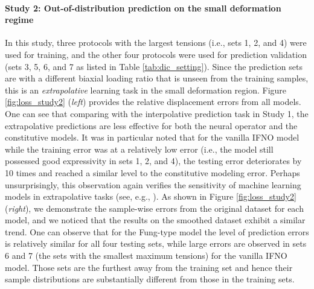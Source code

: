 \documentclass[twocolumn,10pt]{asme2ej}
\renewcommand{\~}{\tilde}
\renewcommand{\-}{\bar}
\newcommand{\8}{\infty}
\numberwithin{equation}{section}
\begin{document}
\paragraph{Study 2: Out-of-distribution prediction on the small deformation regime} In this study, three protocols with the largest tensions (i.e., sets 1, 2, and 4) were used for training, and the other four protocols were used for prediction validation (sets 3, 5, 6, and 7 as listed in Table \ref{tab:dic_setting}). Since the prediction sets are with a different biaxial loading ratio that is unseen from the training samples, this is an {\it extrapolative} learning task in the small deformation region. Figure \ref{fig:loss_study2} ({\it left}) provides the relative displacement errors from all models. One can see that comparing with the interpolative prediction task in Study 1, the extrapolative predictions are less effective for both the neural operator and the constitutive models. It was in particular noted that for the vanilla IFNO model while the training error was at a relatively low error (i.e., the model still possessed good expressivity in sets 1, 2, and 4), the testing error deteriorates by 10 times and reached a similar level to the constitutive modeling error. Perhaps unsurprisingly, this observation again verifies the sensitivity of machine learning models in extrapolative tasks (see, e.g., \cite{he2021manifold}). As shown in Figure \ref{fig:loss_study2} ({\it right}), we demonstrate the sample-wise errors from the original dataset for each model, and we noticed that the results on the smoothed dataset exhibit a similar trend. One can observe that for the Fung-type model the level of prediction errors is relatively similar for all four testing sets, while large errors are observed in sets 6 and 7 (the sets with the smallest maximum tensions) for the vanilla IFNO model. Those sets are the furthest away from the training set and hence their sample distributions are substantially different from those in the training sets. 
\end{document}
